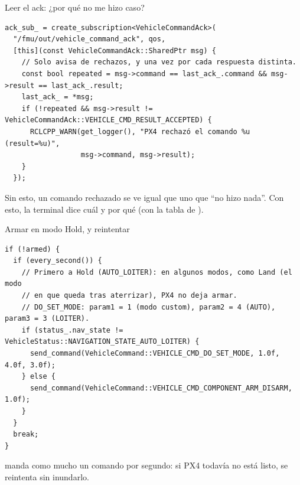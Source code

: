 \begin{frame}[fragile]{Leer el ack: ¿por qué no me hizo caso?}
  \begin{lstlisting}[style=cpp,caption={goto\_mission.cpp}]
ack_sub_ = create_subscription<VehicleCommandAck>(
  "/fmu/out/vehicle_command_ack", qos,
  [this](const VehicleCommandAck::SharedPtr msg) {
    // Solo avisa de rechazos, y una vez por cada respuesta distinta.
    const bool repeated = msg->command == last_ack_.command && msg->result == last_ack_.result;
    last_ack_ = *msg;
    if (!repeated && msg->result != VehicleCommandAck::VEHICLE_CMD_RESULT_ACCEPTED) {
      RCLCPP_WARN(get_logger(), "PX4 rechazó el comando %u (result=%u)",
                  msg->command, msg->result);
    }
  });
  \end{lstlisting}
  \small Sin esto, un comando rechazado se ve igual que uno que ``no hizo nada''. Con esto, la terminal
  dice cuál y por qué (con la tabla de ).
\end{frame}

\begin{frame}[fragile]{Armar en modo Hold, y reintentar}
  \begin{lstlisting}[style=cpp,caption={goto\_mission.cpp, estado ARMING}]
if (!armed) {
  if (every_second()) {
    // Primero a Hold (AUTO_LOITER): en algunos modos, como Land (el modo
    // en que queda tras aterrizar), PX4 no deja armar.
    // DO_SET_MODE: param1 = 1 (modo custom), param2 = 4 (AUTO), param3 = 3 (LOITER).
    if (status_.nav_state != VehicleStatus::NAVIGATION_STATE_AUTO_LOITER) {
      send_command(VehicleCommand::VEHICLE_CMD_DO_SET_MODE, 1.0f, 4.0f, 3.0f);
    } else {
      send_command(VehicleCommand::VEHICLE_CMD_COMPONENT_ARM_DISARM, 1.0f);
    }
  }
  break;
}
  \end{lstlisting}
  \small {} manda como mucho un comando por segundo: si PX4 todavía no está listo, se
  reintenta sin inundarlo.
\end{frame}

